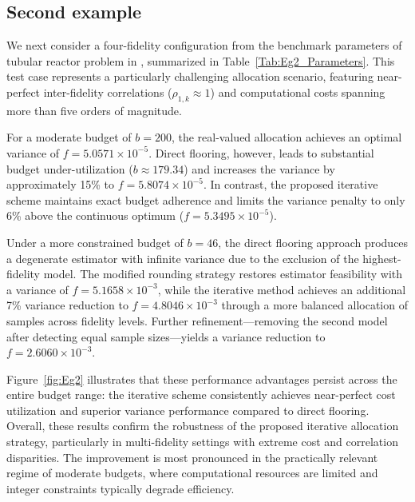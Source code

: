 \subsection{Second example}
We next consider a four-fidelity configuration from the benchmark parameters of tubular reactor problem in \cite{PeWiGu:2016}, summarized in Table~\ref{Tab:Eg2_Parameters}. This test case represents a particularly challenging allocation scenario, featuring near-perfect inter-fidelity correlations ($\rho_{1,k} \approx 1$) and computational costs spanning more than five orders of magnitude. 

For a moderate budget of $b=200$, the real-valued allocation achieves an optimal variance of $f=5.0571\times10^{-5}$. Direct flooring, however, leads to substantial budget under-utilization ($b \approx 179.34$) and increases the variance by approximately 15\% to $f=5.8074\times10^{-5}$. In contrast, the proposed iterative scheme maintains exact budget adherence and limits the variance penalty to only 6\% above the continuous optimum ($f=5.3495\times10^{-5}$).

Under a more constrained budget of $b=46$, the direct flooring approach produces a degenerate estimator with infinite variance due to the exclusion of the highest-fidelity model. The modified rounding strategy restores estimator feasibility with a variance of $f=5.1658\times10^{-3}$, while the iterative method achieves an additional 7\% variance reduction to $f=4.8046\times10^{-3}$ through a more balanced allocation of samples across fidelity levels. Further refinement—removing the second model after detecting equal sample sizes—yields a variance reduction to $f=2.6060\times10^{-3}$.

Figure~\ref{fig:Eg2} illustrates that these performance advantages persist across the entire budget range: the iterative scheme consistently achieves near-perfect cost utilization and superior variance performance compared to direct flooring. Overall, these results confirm the robustness of the proposed iterative allocation strategy, particularly in multi-fidelity settings with extreme cost and correlation disparities. The improvement is most pronounced in the practically relevant regime of moderate budgets, where computational resources are limited and integer constraints typically degrade efficiency.




